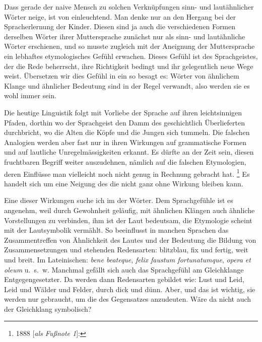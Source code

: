 {Dass gerade der naive Mensch zu solchen Verknüpfungen sinn- und lautähnlicher Wörter neige, ist von  einleuchtend. Man denke nur an den Hergang bei der Spracherlernung der Kinder. Diesen sind ja auch die verschiedenen Formen derselben Wörter ihrer Muttersprache zunächst nur als sinn- und lautähnliche Wörter erschienen, und so musste zugleich mit der Aneignung der Muttersprache ein lebhaftes etymologisches Gefühl erwachen. Dieses Gefühl ist  des  Sprachgeistes, der die Rede beherrscht, ihre Richtigkeit bedingt und ihr gelegentlich neue Wege weist. Übersetzen wir dies Gefühl in ein  so besagt es: Wörter von ähnlichem Klange und ähnlicher Bedeutung sind in der Regel verwandt, also werden sie es wohl immer sein.

Die heutige Linguistik folgt mit Vorliebe der Sprache auf ihren leichtsinnigen Pfaden, dorthin wo der Sprachgeist den Damm des geschichtlich Überlieferten durchbricht, wo die Alten die Köpfe  und die Jungen sich tummeln. Die falschen Analogien werden aber fast \label{fp.221} nur in ihren Wirkungen \label{sp.222} auf grammatische Formen und auf lautliche Unregelmässigkeiten erkannt. Es dürfte an der Zeit sein, diesen fruchtbaren Begriff weiter auszudehnen, nämlich auf die falschen Etymologien, deren Einflüsse man vielleicht noch nicht genug in Rechnung gebracht hat. \footnote{1888 [\textit{als Fußnote 1}]: } Es handelt sich um eine Neigung des  die nicht ganz ohne Wirkung bleiben kann.

Eine dieser Wirkungen suche ich im  der Wörter. Dem Sprachgefühle ist es angenehm, weil durch Gewohnheit geläufig, mit ähnlichen Klängen auch ähnliche Vorstellungen zu verbinden, ihm ist der Laut bedeutsam, die Etymologie scheint mit der Lautsymbolik vermählt. So beeinflusst in manchen Sprachen das Zusammentreffen von Ähnlichkeit des Lautes und der Bedeutung die  Bildung von Zusammensetzungen und stehenden Redensarten: blitzblau,  fix und fertig, weit und breit. Im Lateinischen: \textit{bene beateque}, \textit{felix faustum fortunatumque}, \textit{opera et oleum} u.~s.~w. Manchmal gefällt sich auch das Sprachgefühl am Gleichklange Entgegengesetzter. Da werden dann Redensarten gebildet wie: Lust und Leid, Leid und  Wälder und Felder, durch dick und dünn. Aber, und das ist wichtig, sie werden nur gebraucht, um die  des Gegensatzes anzudeuten. Wäre da nicht auch der Gleichklang symbolisch?

}

